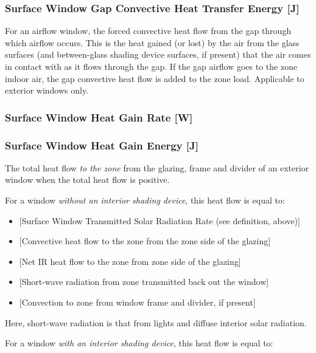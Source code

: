 \subsubsection{Surface Window Gap Convective Heat Transfer Energy {[}J{]}}\label{surface-window-gap-convective-heat-transfer-energy-j}

For an airflow window, the forced convective heat flow from the gap through which airflow occurs. This is the heat gained (or lost) by the air from the glass surfaces (and between-glass shading device surfaces, if present) that the air comes in contact with as it flows through the gap. If the gap airflow goes to the zone indoor air, the gap convective heat flow is added to the zone load. Applicable to exterior windows only.

\subsubsection{Surface Window Heat Gain Rate {[}W{]}}\label{surface-window-heat-gain-rate-w}

\subsubsection{Surface Window Heat Gain Energy {[}J{]}}\label{surface-window-heat-gain-energy-j}

The total heat flow \emph{to the zone} from the glazing, frame and divider of an exterior window when the total heat flow is positive.

For a window \emph{without an interior shading device}, this heat flow is equal to:

\begin{itemize}
\item
  {[}Surface Window Transmitted Solar Radiation Rate (see definition, above){]}
\item
  {[}Convective heat flow to the zone from the zone side of the glazing{]}
\item
  {[}Net IR heat flow to the zone from zone side of the glazing{]}
\item
  {[}Short-wave radiation from zone transmitted back out the window{]}
\item
  {[}Convection to zone from window frame and divider, if present{]}
\end{itemize}

Here, short-wave radiation is that from lights and diffuse interior solar radiation.

For a window \emph{with an interior shading device}, this heat flow is equal to:


